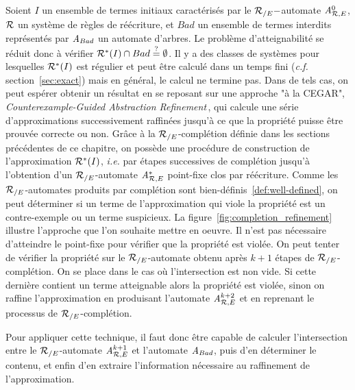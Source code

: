 Soient $I$ un ensemble de termes initiaux caractérisés par le ${\mathcal R_{/E}}-$automate
${\mathit A}_{\mathcal R,E}^0$, $\mathcal R$ un système de règles de réécriture, et $Bad$ un ensemble
de termes interdits représentés par $\mathit A_{Bad}$ un automate d'arbres.
Le problème d'atteignabilité se réduit donc à vérifier 
$\mathcal R^*(I) \cap Bad \stackrel{?}{=}\emptyset$. 
Il y a des classes de systèmes pour lesquelles $\mathcal R^*(I)$ est régulier
et peut être calculé dans un temps fini (\textit{c.f.} section~\ref{sec:exact}) mais
en général, le calcul ne termine pas. Dans de tels cas, on peut espérer 
obtenir un résultat en se reposant sur une approche 
"à la CEGAR", \textit{Counterexample-Guided Abstraction 
  Refinement\,\cite{DBLP:conf/time/Clarke03}}, qui calcule une série d'approximations
successivement raffinées jusqu'à ce que la propriété puisse être prouvée
correcte ou non. 
Grâce à la ${\mathcal R_{/E}}$-complétion définie dans les sections précédentes de ce chapitre,
on possède une procédure de construction de l'approximation $\mathcal R^*(I)$, \textit{i.e.}
par étapes successives de complétion jusqu'à l'obtention d'un ${\mathcal R_{/E}}$-automate ${\mathit A}_{\mathcal R,E}^*$
point-fixe clos par réécriture. Comme les ${\mathcal R_{/E}}$-automates produits par complétion
sont bien-définis~\ref{def:well-defined}, on peut déterminer si un terme de l'approximation
qui viole la propriété est un contre-exemple ou un terme suspicieux.
La figure~\ref{fig:completion_refinement} illustre l'approche que l'on souhaite mettre en oeuvre.
Il n'est pas nécessaire d'atteindre le point-fixe pour vérifier que la propriété est violée.
On peut tenter de vérifier la propriété sur le ${\mathcal R_{/E}}$-automate obtenu après $k+1$ étapes
de ${\mathcal R_{/E}}$-complétion. On se place dans le cas où l'intersection est non vide. Si cette dernière 
contient un terme atteignable alors la propriété est violée, sinon on raffine
l'approximation en produisant l'automate ${\mathit A}_{\mathcal R,E}^{k+2}$ et en reprenant le processus de ${\mathcal R_{/E}}$-complétion.


Pour appliquer cette technique, il faut donc être capable de calculer l'intersection entre
le ${\mathcal R_{/E}}$-automate ${\mathit A}_{\mathcal R,E}^{k+1}$ et l'automate $\mathit A_{Bad}$, puis d'en déterminer 
le contenu, et enfin d'en extraire l'information nécessaire au raffinement de l'approximation.

